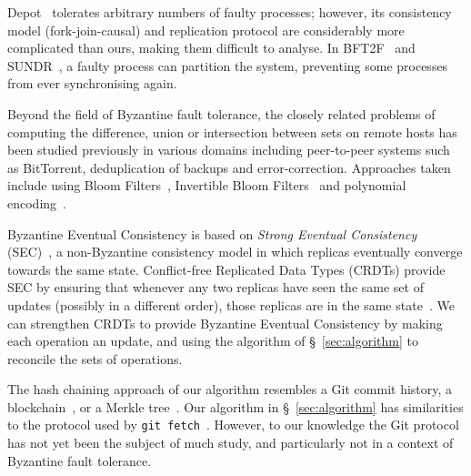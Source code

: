 \documentclass[a4paper,anonymous,USenglish]{lipics-v2019}
\begin{document}
Depot~\cite{Mahajan:2011} tolerates arbitrary numbers of faulty processes; however, its consistency model (fork-join-causal) and replication protocol are considerably more complicated than ours, making them difficult to analyse.
In BFT2F~\cite{Li:2007} and SUNDR~\cite{Mazieres:2002}, a faulty process can partition the system, preventing some processes from ever synchronising again.

Beyond the field of Byzantine fault tolerance, the closely related problems of computing the difference, union or intersection between sets on remote hosts has been studied previously in various domains including peer-to-peer systems such as BitTorrent, deduplication of backups and error-correction.
Approaches taken include using Bloom Filters~\cite{Skjegstad:2011}, Invertible Bloom Filters~\cite{Goodrich:2011,Eppstein:2011} and polynomial encoding~\cite{Minsky:2006}.

Byzantine Eventual Consistency is based on \emph{Strong Eventual Consistency} (SEC)~\cite{Shapiro:2011}, a non-Byzantine consistency model in which replicas eventually converge towards the same state.
Conflict-free Replicated Data Types (CRDTs) provide SEC by ensuring that whenever any two replicas have seen the same set of updates (possibly in a different order), those replicas are in the same state~\cite{Shapiro:2011}.
We can strengthen CRDTs to provide Byzantine Eventual Consistency by making each operation an update, and using the algorithm of \S~\ref{sec:algorithm} to reconcile the sets of operations.

The hash chaining approach of our algorithm resembles a Git commit history, a blockchain~\cite{Bano:2019}, or a Merkle tree~\cite{Merkle:1987}.
Our algorithm in \S~\ref{sec:algorithm} has similarities to the protocol used by \texttt{git fetch}~\cite{GitHTTP}.
However, to our knowledge the Git protocol has not yet been the subject of much study, and particularly not in a context of Byzantine fault tolerance.





\end{document}
